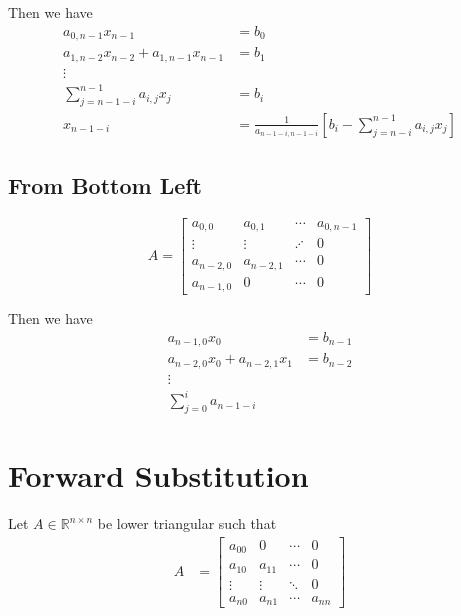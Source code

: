 \documentclass{article}
\begin{document}
Then we have
\begin{align*}
    a_{0,n-1} x_{n-1} &= b_0 \\
    a_{1,n-2} x_{n-2} + a_{1,n-1} x_{n-1} &= b_1 \\
    \vdots \\
    \sum_{j=n-1-i}^{n-1} a_{i,j} x_j &= b_i \\
    x_{n-1-i} &= \frac{1}{a_{n-1-i,n-1-i}}\left[ b_i - \sum_{j=n-i}^{n-1} a_{i,j} x_j \right]
\end{align*}

\subsection{From Bottom Left}

\begin{equation*}
    A = \begin{bmatrix}
        a_{0,0} & a_{0,1} & \cdots & a_{0,n-1} \\
        \vdots & \vdots & \iddots & 0 \\
        a_{n-2,0} & a_{n-2,1} & \cdots & 0 \\
        a_{n-1,0} & 0 & \cdots & 0
    \end{bmatrix}
\end{equation*}

Then we have
\begin{align*}
    a_{n-1,0} x_0 &= b_{n-1} \\
    a_{n-2,0} x_0 + a_{n-2,1} x_1 &= b_{n-2} \\
    \vdots \\
    \sum_{j=0}^i a_{n-1-i}
\end{align*}

\section{Forward Substitution}

Let $A \in \mathbb{R}^{n \times n}$ be lower triangular such that
\begin{align*}
    A &= \begin{bmatrix}
        a_{00} & 0 & \cdots & 0 \\
        a_{10} & a_{11} & \cdots & 0 \\
        \vdots & \vdots & \ddots & 0 \\
        a_{n0} & a_{n1} & \cdots & a_{nn}
    \end{bmatrix}
\end{align*}
\end{document}

